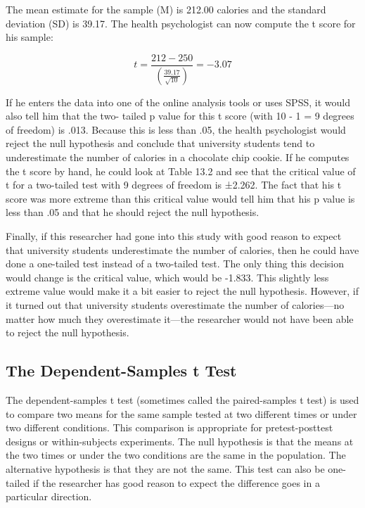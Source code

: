 The mean estimate for the sample (M) is 212.00 calories and the standard deviation (SD) is 39.17. The health psychologist can now compute the t score for his sample:



\begin{equation}
t = \frac{212-250}{\left( \frac{39.17}{\sqrt{10}}\right)} = -3.07
\end{equation}


If he enters the data into one of the online analysis tools or uses SPSS, it would also tell him that the two- tailed p value for this t score (with 10 - 1 = 9 degrees of freedom) is .013. Because this is less than .05, the health psychologist would reject the null hypothesis and conclude that university students tend to underestimate the number of calories in a chocolate chip cookie. If he computes the t score by hand, he could look at Table 13.2 and see that the critical value of t for a two-tailed test with 9 degrees of freedom is ±2.262. The fact that his t score was more extreme than this critical value would tell him that his p value is less than .05 and that he should reject the null hypothesis.


Finally, if this researcher had gone into this study with good reason to expect that university students underestimate the number of calories, then he could have done a one-tailed test instead of a two-tailed test. The only thing this decision would change is the critical value, which would be -1.833. This slightly less extreme value would make it a bit easier to reject the null hypothesis. However, if it turned out that university students overestimate the number of calories---no matter how much they overestimate it---the researcher would not have been able to reject the null hypothesis.


\subsection{The Dependent-Samples t Test}

The dependent-samples t test (sometimes called the paired-samples t test) is used to compare two means for the same sample tested at two different times or under two different conditions. This comparison is appropriate for pretest-posttest designs or within-subjects experiments. The null hypothesis is that the means at the two times or under the two conditions are the same in the population. The alternative hypothesis is that they are not the same. This test can also be one-tailed if the researcher has good reason to expect the difference goes in a particular direction.

